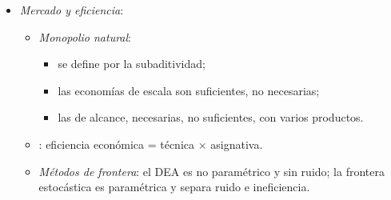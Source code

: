 \documentclass[11pt]{article}
\begin{document}
\begin{itemize}
\item \emph{Mercado y eficiencia}:
  \begin{itemize}
  \item \emph{Monopolio natural}:
    \begin{itemize}
    \item se define por la subaditividad;
    \item las economías de escala son suficientes, no necesarias;
    \item las de alcance, necesarias, no suficientes, con varios productos.
    \end{itemize}
  \item \emph{}: eficiencia económica = técnica $\times$ asignativa.
  \item \emph{Métodos de frontera}: el DEA es no paramétrico y sin ruido; la frontera estocástica es paramétrica y separa ruido e ineficiencia.
  \end{itemize}
\end{itemize}

\bibliografia
\end{document}
